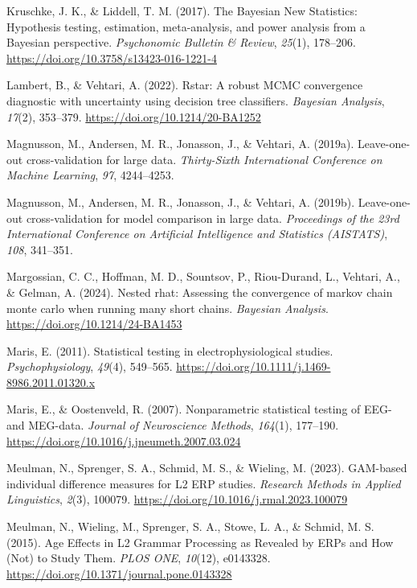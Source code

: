 \documentclass[
  doc,
  floatsintext,
  longtable,
  a4paper,
  nolmodern,
  notxfonts,
  notimes,
  colorlinks=true,linkcolor=blue,citecolor=blue,urlcolor=blue]{apa7}
\newlength{\cslhangindent}
\newenvironment{CSLReferences}[2] %
 {\begin{list}{}{%
  \setlength{\itemindent}{0pt}
  \setlength{\leftmargin}{0pt}
  \setlength{\parsep}{0pt}
  \ifodd #1
   \setlength{\leftmargin}{\cslhangindent}
   \setlength{\itemindent}{-1\cslhangindent}
  \fi
  \setlength{\itemsep}{#2\baselineskip}}}
 {\end{list}}
\begin{document}
\begin{CSLReferences}{1}{0}
Kruschke, J. K., \& Liddell, T. M. (2017). The Bayesian New Statistics:
Hypothesis testing, estimation, meta-analysis, and power analysis from a
Bayesian perspective. \emph{Psychonomic Bulletin \& Review},
\emph{25}(1), 178--206. \url{https://doi.org/10.3758/s13423-016-1221-4}

Lambert, B., \& Vehtari, A. (2022). {Rstar}: A robust MCMC convergence
diagnostic with uncertainty using decision tree classifiers.
\emph{Bayesian Analysis}, \emph{17}(2), 353--379.
\url{https://doi.org/10.1214/20-BA1252}

Magnusson, M., Andersen, M. R., Jonasson, J., \& Vehtari, A. (2019a).
Leave-one-out cross-validation for large data. \emph{Thirty-Sixth
International Conference on Machine Learning}, \emph{97}, 4244--4253.

Magnusson, M., Andersen, M. R., Jonasson, J., \& Vehtari, A. (2019b).
Leave-one-out cross-validation for model comparison in large data.
\emph{Proceedings of the 23rd International Conference on Artificial
Intelligence and Statistics (AISTATS)}, \emph{108}, 341--351.

Margossian, C. C., Hoffman, M. D., Sountsov, P., Riou-Durand, L.,
Vehtari, A., \& Gelman, A. (2024). Nested rhat: Assessing the
convergence of markov chain monte carlo when running many short chains.
\emph{Bayesian Analysis}. \url{https://doi.org/10.1214/24-BA1453}

Maris, E. (2011). Statistical testing in electrophysiological studies.
\emph{Psychophysiology}, \emph{49}(4), 549--565.
\url{https://doi.org/10.1111/j.1469-8986.2011.01320.x}

Maris, E., \& Oostenveld, R. (2007). Nonparametric statistical testing
of EEG- and MEG-data. \emph{Journal of Neuroscience Methods},
\emph{164}(1), 177--190.
\url{https://doi.org/10.1016/j.jneumeth.2007.03.024}

Meulman, N., Sprenger, S. A., Schmid, M. S., \& Wieling, M. (2023).
GAM-based individual difference measures for L2 ERP studies.
\emph{Research Methods in Applied Linguistics}, \emph{2}(3), 100079.
\url{https://doi.org/10.1016/j.rmal.2023.100079}

Meulman, N., Wieling, M., Sprenger, S. A., Stowe, L. A., \& Schmid, M.
S. (2015). Age Effects in L2 Grammar Processing as Revealed by ERPs and
How (Not) to Study Them. \emph{PLOS ONE}, \emph{10}(12), e0143328.
\url{https://doi.org/10.1371/journal.pone.0143328}


\end{CSLReferences}
\end{document}

